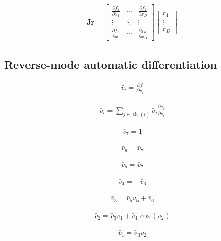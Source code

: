 \documentclass{article}
\begin{document}
\begin{align*}
\mathbf{J} \mathbf{r} = 
\begin{bmatrix}
\frac{\partial f_1}{\partial x_1} & \cdots & \frac{\partial f_1}{\partial x_D} \\
\vdots & \ddots & \vdots \\
\frac{\partial f_K}{\partial x_1} & \cdots & \frac{\partial f_K}{\partial x_D}
\end{bmatrix}
\begin{bmatrix}
r_1 \\
\vdots \\
r_D
\end{bmatrix} \tag{8.67}
\end{align*}

\subsection{Reverse-mode automatic differentiation}

\begin{align*}
\bar{v}_i = \frac{\partial f}{\partial v_i} \tag{8.68}
\end{align*}

\begin{align*}
\bar{v}_i = \sum_{j \in \operatorname{ch}(i)} \bar{v}_j \frac{\partial v_j}{\partial v_i} \tag{8.69}
\end{align*}

\begin{align*}
\bar{v}_7 = 1 \tag{8.70}
\end{align*}

\begin{align*}
\bar{v}_6 = \bar{v}_7 \tag{8.71}
\end{align*}

\begin{align*}
\bar{v}_5 = \bar{v}_7 \tag{8.72}
\end{align*}

\begin{align*}
\bar{v}_4 = -\bar{v}_6 \tag{8.73}
\end{align*}

\begin{align*}
\bar{v}_3 = \bar{v}_5 v_5 + \bar{v}_6 \tag{8.74}
\end{align*}

\begin{align*}
\bar{v}_2 = \bar{v}_3 v_1 + \bar{v}_4 \cos(v_2) \tag{8.75}
\end{align*}

\begin{align*}
\bar{v}_1 = \bar{v}_3 v_2 \tag{8.76}
\end{align*}
\end{document}
